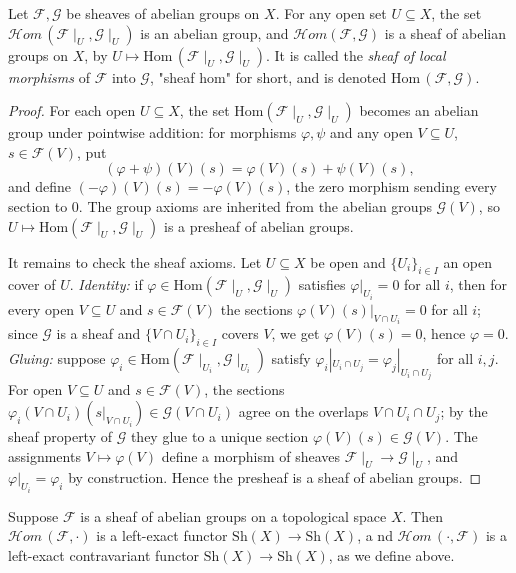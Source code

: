 \documentclass[11pt]{article}
\begin{document}
\begin{proposition}
  \cite[Exercise II.1.15]{hartsAG}
  Let $\mathscr{F},\mathscr{G}$ be sheaves of abelian groups on $X$. 
  For any open set $U \subseteq X$, the set 
  $\mathscr{H}{om}\,(\mathscr{F}\mid_{U},\mathscr{G}\mid_{U})$ 
  is an abelian group, and $\mathscr{H}{om}(\mathscr{F},\mathscr{G})$ 
  is a sheaf of abelian groups on $X$, 
  by $U \mapsto \mathrm{Hom}\,(\mathscr{F}\mid_{U},\mathscr{G}\mid_{U})$. 
  It is called the \emph{sheaf of local morphisms} 
  of $\mathscr{F}$ into $\mathscr{G}$, 
  "sheaf hom" for short, and is denoted $\mathrm{Hom}\,(\mathscr{F},\mathscr{G})$. 
\end{proposition}

\begin{proof}
  For each open $U\subseteq X$, the set $\mathrm{Hom}(\mathscr{F}\mid_U,\mathscr{G}\mid_U)$ becomes an abelian group under pointwise addition: for morphisms $\varphi,\psi$ and any open $V\subseteq U$, $s\in\mathscr{F}(V)$, put
  \[
    (\varphi+\psi)(V)(s)=\varphi(V)(s)+\psi(V)(s),
  \]
  and define $(-\varphi)(V)(s)=-\varphi(V)(s)$, the zero morphism sending every section to $0$. The group axioms are inherited from the abelian groups $\mathscr{G}(V)$, so $U\mapsto\mathrm{Hom}(\mathscr{F}\mid_U,\mathscr{G}\mid_U)$ is a presheaf of abelian groups.

  It remains to check the sheaf axioms. Let $U\subseteq X$ be open and $\{U_i\}_{i\in I}$ an open cover of $U$.
  \emph{Identity:} if $\varphi\in\mathrm{Hom}(\mathscr{F}\mid_U,\mathscr{G}\mid_U)$ satisfies $\varphi|_{U_i}=0$ for all $i$, then for every open $V\subseteq U$ and $s\in\mathscr{F}(V)$ the sections $\varphi(V)(s)|_{V\cap U_i}=0$ for all $i$; since $\mathscr{G}$ is a sheaf and $\{V\cap U_i\}_{i\in I}$ covers $V$, we get $\varphi(V)(s)=0$, hence $\varphi=0$.
  \emph{Gluing:} suppose $\varphi_i\in\mathrm{Hom}(\mathscr{F}\mid_{U_i},\mathscr{G}\mid_{U_i})$ satisfy $\varphi_i|_{U_i\cap U_j}=\varphi_j|_{U_i\cap U_j}$ for all $i,j$. For open $V\subseteq U$ and $s\in\mathscr{F}(V)$, the sections $\varphi_i(V\cap U_i)(s|_{V\cap U_i})\in\mathscr{G}(V\cap U_i)$ agree on the overlaps $V\cap U_i\cap U_j$; by the sheaf property of $\mathscr{G}$ they glue to a unique section $\varphi(V)(s)\in\mathscr{G}(V)$. The assignments $V\mapsto\varphi(V)$ define a morphism of sheaves $\mathscr{F}\mid_U\to\mathscr{G}\mid_U$, and $\varphi|_{U_i}=\varphi_i$ by construction. Hence the presheaf is a sheaf of abelian groups.
\end{proof}

\begin{proposition}
  \cite[Exercise 2.6.I]{vakilTheRisingSea}
  Suppose $\mathscr{F}$ is a sheaf of abelian groups on a topological space $X$. 
  Then $\mathscr{H}{om}\,(\mathscr{F},\cdot)$ is a left-exact functor 
  $\mathrm{Sh}(X) \to \mathrm{Sh}(X)$, a
  nd $\mathscr{H}{om}\,(\cdot,\mathscr{F})$ is a left-exact contravariant 
  functor $\mathrm{Sh}(X) \to \mathrm{Sh}(X)$, as we define above. 
\end{proposition}
\end{document}
